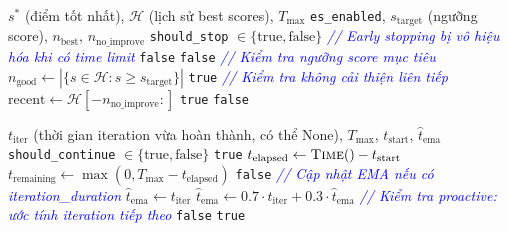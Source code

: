 \documentclass[12pt,a4paper]{article}
\begin{document}
\begin{algorithm}[H]
\caption{Kiểm tra điều kiện dừng sớm (\textsc{CheckEarlyStopping})}
\label{alg:gs_early_stop}
\begin{algorithmic}[1]
\Require $s^*$ (điểm tốt nhất), $\mathcal{H}$ (lịch sử best scores), $T_{\max}$
\Require \texttt{es\_enabled}, $s_{\text{target}}$ (ngưỡng score), $n_{\text{best}}$, $n_{\text{no\_improve}}$
\Ensure \texttt{should\_stop} $\in \{\text{true}, \text{false}\}$
\Statex \textcolor{blue}{\textit{// Early stopping bị vô hiệu hóa khi có time limit}}
    \State \Return \texttt{false} 
\EndIf
{}
    \State \Return \texttt{false}
\EndIf
\Statex \textcolor{blue}{\textit{// Kiểm tra ngưỡng score mục tiêu}}
    \State $n_{\text{good}} \gets \left|\{s \in \mathcal{H} : s \geq s_{\text{target}}\}\right|$
        \State \Return \texttt{true} 
    \EndIf
\EndIf
\Statex \textcolor{blue}{\textit{// Kiểm tra không cải thiện liên tiếp}}
    \State $\text{recent} \gets \mathcal{H}[-n_{\text{no\_improve}}:]$
        \State \Return \texttt{true} 
    \EndIf
\EndIf
\State \Return \texttt{false}
\end{algorithmic}
\end{algorithm}

\begin{algorithm}[H]
\caption{Kiểm tra thời gian proactive --- EMA (\textsc{ShouldStartNextIteration})}
\label{alg:should_start}
\begin{algorithmic}[1]
\Require $t_{\text{iter}}$ (thời gian iteration vừa hoàn thành, có thể None), $T_{\max}$, $t_{\text{start}}$, $\hat{t}_{\text{ema}}$
\Ensure \texttt{should\_continue} $\in \{\text{true}, \text{false}\}$
    \State \Return \texttt{true} 
\EndIf
\State $t_{\text{elapsed}} \gets \textsc{Time}() - t_{\text{start}}$
\State $t_{\text{remaining}} \gets \max(0, T_{\max} - t_{\text{elapsed}})$
    \State \Return \texttt{false} 
\EndIf
\Statex \textcolor{blue}{\textit{// Cập nhật EMA nếu có iteration\_duration}}
        \State $\hat{t}_{\text{ema}} \gets t_{\text{iter}}$
    \Else
        \State $\hat{t}_{\text{ema}} \gets 0.7 \cdot t_{\text{iter}} + 0.3 \cdot \hat{t}_{\text{ema}}$
    \EndIf
\EndIf
\Statex \textcolor{blue}{\textit{// Kiểm tra proactive: ước tính iteration tiếp theo}}
    \State \Return \texttt{false} 
\EndIf
\State \Return \texttt{true}
\end{algorithmic}
\end{algorithm}
\end{document}
